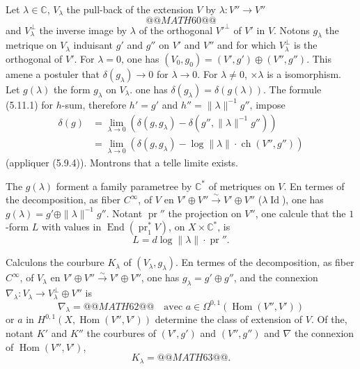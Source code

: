 \documentclass[12pt,a4paper]{article}
\theoremstyle{plain}
\theoremstyle{definition}
\DeclareMathOperator{\ch}{ch}
\DeclareMathOperator{\End}{End}
\DeclareMathOperator{\Hom}{Hom}
\DeclareMathOperator{\Id}{Id}
\DeclareMathOperator{\pr}{pr}
\newcommand{\CC}{\mathbb{C}}
\begin{document}
Let $\lambda \in \CC$, $V_\lambda$ the pull-back of the extension $V$ by $\lambda: V'' \to V''$
\[
@@MATH60@@
\]
and $V_\lambda^\perp$ the inverse image by $\lambda$ of the orthogonal $V'^\perp$ of $V'$ in $V$. Notons $g_\lambda$
the metrique on $V_\lambda$ induisant $g'$ and $g''$ on $V'$ and $V''$ and for which $V_\lambda^\perp$ is
the orthogonal of $V'$. For $\lambda = 0$, one has $(V_0, g_0) = (V', g') \oplus (V'', g'')$. This amene
a postuler that $\delta(g_\lambda) \to 0$ for $\lambda \to 0$. For $\lambda \neq 0$, $\times \lambda$ is a isomorphism.
Let $g(\lambda)$ the form $g_\lambda$ on $V_\lambda$. one has $\delta(g_\lambda) = \delta(g(\lambda))$. The formule (5.11.1)
for $h$-sum, therefore $h' = g'$ and $h'' = \|\lambda\|^{-1} g''$, impose
\[
\begin{aligned}
\delta(g) &= \lim_{\lambda \to 0} (\delta(g, g_\lambda) - \delta(g'', \|\lambda\|^{-1} g'')) \\
&= \lim_{\lambda \to 0} (\delta(g, g_\lambda) - \log\|\lambda\| \cdot \ch(V'', g''))
\end{aligned}
\]
(appliquer (5.9.4)). Montrons that a telle limite exists.

The $g(\lambda)$ forment a family parametree by $\CC^*$ of metriques on $V$.
En termes of the decomposition, as fiber $C^\infty$, of $V$ en $V' \oplus V'' \xrightarrow{\sim} V' \oplus V''$ ($\lambda \Id$),
one has $g(\lambda) = g' \oplus \|\lambda\|^{-1} g''$. Notant $\pr''$ the projection on $V''$, one calcule
that the $1$-form $L$ with values in $\End(\pr_1^* V)$, on $X \times \CC^*$, is
\[
L = d\log \|\lambda\| \cdot \pr'' .
\]

Calculons the courbure $K_\lambda$ of $(V_\lambda, g_\lambda)$. En termes of the decomposition,
as fiber $C^\infty$, of $V_\lambda$ en $V' \oplus V'' \xrightarrow{\sim} V' \oplus V''$, one has $g_\lambda = g' \oplus g''$, and the
connexion $\nabla_\lambda: V_\lambda \to V_\lambda^\perp \oplus V''$ is
\[
\nabla_\lambda = @@MATH62@@ \quad \text{avec } a \in \Omega^{0,1}(\Hom(V'', V'))
\]
or $a$ in $H^{0,1}(X, \Hom(V'', V'))$ determine the class of extension of $V$. Of the, notant
$K'$ and $K''$ the courbures of $(V', g')$ and $(V'', g'')$ and $\nabla$ the connexion of $\Hom(V'',
V')$,
\[
K_\lambda = @@MATH63@@ .
\]
\end{document}
